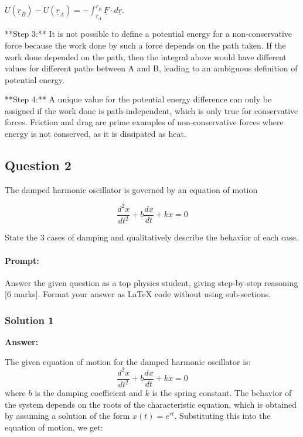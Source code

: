 \documentclass{article}
\begin{document}
$U(\underline{r}_B) - U(\underline{r}_A) = -\int_{\underline{r}_A}^{\underline{r}_B} \underline{F} \cdot d\underline{r}$.

**Step 3:** It is not possible to define a potential energy for a non-conservative force because the work done by such a force depends on the path taken.
If the work done depended on the path, then the integral above would have different values for different paths between A and B, leading to an ambiguous definition of potential energy.

**Step 4:** A unique value for the potential energy difference can only be assigned if the work done is path-independent, which is only true for conservative forces.
Friction and drag are prime examples of non-conservative forces where energy is not conserved, as it is dissipated as heat.

\subsection{Question 2}

The damped harmonic oscillator is governed by an equation of motion

\begin{equation*}
\frac{d^2x}{dt^2} + b\frac{dx}{dt} + kx = 0
\end{equation*}

State the 3 cases of damping and qualitatively describe the behavior of each case.

\paragraph{Prompt: \\} 
Answer the given question as a top physics student, giving step-by-step reasoning [6 marks].
Format your answer as LaTeX code without using sub-sections. 

\subsubsection{Solution 1}
\noindent \textbf{Answer:}

The given equation of motion for the damped harmonic oscillator is:
\begin{equation*}
\frac{d^2x}{dt^2} + b\frac{dx}{dt} + kx = 0
\end{equation*}
where $b$ is the damping coefficient and $k$ is the spring constant. The behavior of the system depends on the roots of the characteristic equation, which is obtained by assuming a solution of the form $x(t) = e^{rt}$. Substituting this into the equation of motion, we get:
\end{document}

